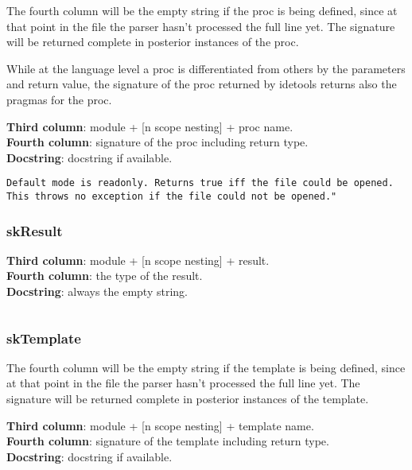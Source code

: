 The fourth column will be the empty string if the proc is being defined,
since at that point in the file the parser hasn't processed the full
line yet. The signature will be returned complete in posterior instances
of the proc.

While at the language level a proc is differentiated from others by the
parameters and return value, the signature of the proc returned by
idetools returns also the pragmas for the proc.

\textbf{Third column}: module + {[}n scope nesting{]} + proc name.\\
\textbf{Fourth column}: signature of the proc including return type.\\
\textbf{Docstring}: docstring if available.

\begin{verbatim}
Default mode is readonly. Returns true iff the file could be opened.
This throws no exception if the file could not be opened."
\end{verbatim}

\hypertarget{skresult}{%
\subsubsection{skResult}\label{skresult}}

\textbf{Third column}: module + {[}n scope nesting{]} + result.\\
\textbf{Fourth column}: the type of the result.\\
\textbf{Docstring}: always the empty string.

\begin{verbatim}
\end{verbatim}

\hypertarget{sktemplate}{%
\subsubsection{skTemplate}\label{sktemplate}}

The fourth column will be the empty string if the template is being
defined, since at that point in the file the parser hasn't processed the
full line yet. The signature will be returned complete in posterior
instances of the template.

\textbf{Third column}: module + {[}n scope nesting{]} + template name.\\
\textbf{Fourth column}: signature of the template including return
type.\\
\textbf{Docstring}: docstring if available.

